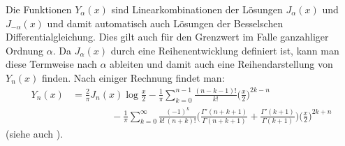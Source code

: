 Die Funktionen $Y_\alpha(x)$ sind Linearkombinationen der Lösungen
$J_\alpha(x)$ und $J_{-\alpha}(x)$ und damit automatisch auch Lösungen
der Besselschen Differentialgleichung.
Dies gilt auch für den Grenzwert im Falle ganzahliger Ordnung $\alpha$.
Da $J_{\alpha}(x)$ durch eine Reihenentwicklung definiert ist, kann man
diese Termweise nach $\alpha$ ableiten und damit auch eine 
Reihendarstellung von $Y_n(x)$ finden.
Nach einiger Rechnung findet man:
\begin{align*}
Y_n(x)
&=
\frac{2}{\pi}J_n(x)\log\frac{x}2
-
\frac1{\pi}
\sum_{k=0}^{n-1} \frac{(n-k-1)!}{k!}\biggl(\frac{x}2\biggr)^{2k-n}
\\
&\qquad\qquad
-
\frac1{\pi}
\sum_{k=0}^\infty \frac{(-1)^k}{k!\,(n+k)!}
\biggl(
\frac{\Gamma'(n+k+1)}{\Gamma(n+k+1)}
+
\frac{\Gamma'(k+1)}{\Gamma(k+1)}
\biggr)
\biggl(
\frac{x}2
\biggr)^{2k+n}
\end{align*}
(siehe auch \cite[p.~200]{buch:specialfunctions}).

